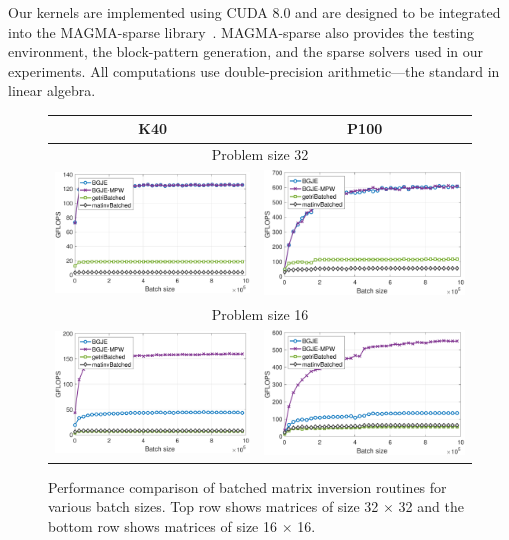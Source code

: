 Our kernels are implemented using CUDA 8.0 and are designed to be integrated
into the MAGMA-sparse library~\cite{magma}. MAGMA-sparse also provides the
testing environment, the block-pattern generation, and the sparse solvers used
in our experiments. All computations use double-precision arithmetic---the
standard in linear algebra.

\begin{figure}
\begin{center}
{\scriptsize
\begin{tabular}{cc}
K40 & P100\\
\hline
\multicolumn{2}{c}{Problem size 32}\\
\includegraphics[width=.46\columnwidth]{plots/gje_n_d_K40_32.pdf}&
\includegraphics[width=.46\columnwidth]{plots/gje_n_d_P100_32.pdf}\\
\hline
\multicolumn{2}{c}{Problem size 16}\\
\includegraphics[width=.46\columnwidth]{plots/gje_n_d_K40_16.pdf}&
\includegraphics[width=.46\columnwidth]{plots/gje_n_d_P100_16.pdf}
\end{tabular}
}
\end{center}
\caption{
Performance comparison of batched matrix inversion routines for various batch sizes. 
Top row shows matrices of size 32 $\times$ 32 and the bottom row shows matrices of size 16 $\times$ 16.
}
\label{fig:bgje-mpw-performance}
\end{figure}

